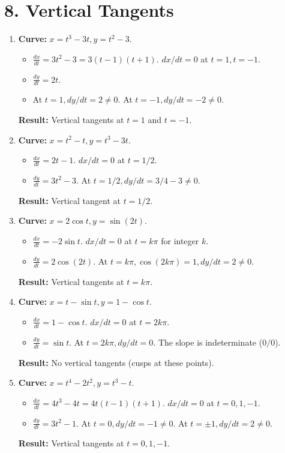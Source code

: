 \documentclass[12pt]{article}
\newcommand{\problemsettitle}[1]{\section*{#1}}
\begin{document}
\newpage
\problemsettitle{8. Vertical Tangents}
\begin{enumerate}
    \item \textbf{Curve:} $x=t^3-3t, y=t^2-3$.
    \begin{itemize}
        \item $\frac{dx}{dt} = 3t^2-3=3(t-1)(t+1)$. $dx/dt=0$ at $t=1, t=-1$.
        \item $\frac{dy}{dt} = 2t$.
        \item At $t=1, dy/dt=2 \ne 0$. At $t=-1, dy/dt=-2 \ne 0$.
    \end{itemize}
    \textbf{Result:} Vertical tangents at $t=1$ and $t=-1$.

    \item \textbf{Curve:} $x=t^2-t, y=t^3-3t$.
    \begin{itemize}
        \item $\frac{dx}{dt} = 2t-1$. $dx/dt=0$ at $t=1/2$.
        \item $\frac{dy}{dt} = 3t^2-3$. At $t=1/2, dy/dt=3/4-3 \ne 0$.
    \end{itemize}
    \textbf{Result:} Vertical tangent at $t=1/2$.

    \item \textbf{Curve:} $x=2\cos t, y=\sin(2t)$.
    \begin{itemize}
        \item $\frac{dx}{dt}=-2\sin t$. $dx/dt=0$ at $t=k\pi$ for integer $k$.
        \item $\frac{dy}{dt}=2\cos(2t)$. At $t=k\pi, \cos(2k\pi)=1, dy/dt=2 \ne 0$.
    \end{itemize}
    \textbf{Result:} Vertical tangents at $t=k\pi$.

    \item \textbf{Curve:} $x=t-\sin t, y=1-\cos t$.
    \begin{itemize}
        \item $\frac{dx}{dt}=1-\cos t$. $dx/dt=0$ at $t=2k\pi$.
        \item $\frac{dy}{dt}=\sin t$. At $t=2k\pi, dy/dt=0$. The slope is indeterminate ($0/0$).
    \end{itemize}
    \textbf{Result:} No vertical tangents (cusps at these points).

    \item \textbf{Curve:} $x=t^4-2t^2, y=t^3-t$.
    \begin{itemize}
        \item $\frac{dx}{dt}=4t^3-4t=4t(t-1)(t+1)$. $dx/dt=0$ at $t=0,1,-1$.
        \item $\frac{dy}{dt}=3t^2-1$. At $t=0, dy/dt=-1 \ne 0$. At $t=\pm 1, dy/dt=2 \ne 0$.
    \end{itemize}
    \textbf{Result:} Vertical tangents at $t=0, 1, -1$.


\end{enumerate}
\end{document}
